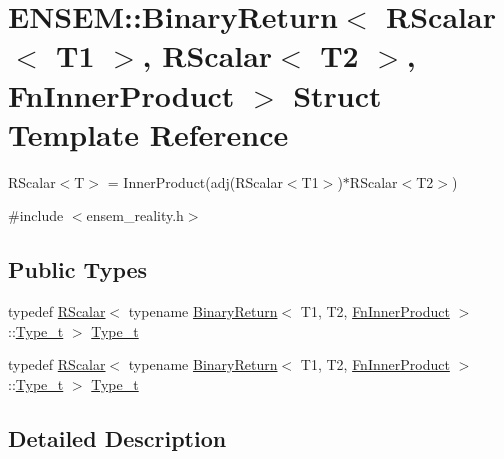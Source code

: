 \hypertarget{structENSEM_1_1BinaryReturn_3_01RScalar_3_01T1_01_4_00_01RScalar_3_01T2_01_4_00_01FnInnerProduct_01_4}{}\section{E\+N\+S\+EM\+:\+:Binary\+Return$<$ R\+Scalar$<$ T1 $>$, R\+Scalar$<$ T2 $>$, Fn\+Inner\+Product $>$ Struct Template Reference}
\label{structENSEM_1_1BinaryReturn_3_01RScalar_3_01T1_01_4_00_01RScalar_3_01T2_01_4_00_01FnInnerProduct_01_4}


R\+Scalar$<$\+T$>$ = Inner\+Product(adj(\+R\+Scalar$<$\+T1$>$)$\ast$\+R\+Scalar$<$\+T2$>$)  




{\ttfamily \#include $<$ensem\+\_\+reality.\+h$>$}

\subsection*{Public Types}
\begin{DoxyCompactItemize}
\item 
typedef \mbox{\hyperlink{classENSEM_1_1RScalar}{R\+Scalar}}$<$ typename \mbox{\hyperlink{structENSEM_1_1BinaryReturn}{Binary\+Return}}$<$ T1, T2, \mbox{\hyperlink{structENSEM_1_1FnInnerProduct}{Fn\+Inner\+Product}} $>$\+::\mbox{\hyperlink{structENSEM_1_1BinaryReturn_3_01RScalar_3_01T1_01_4_00_01RScalar_3_01T2_01_4_00_01FnInnerProduct_01_4_ab67f263abb333e0fd405c675a12d635e}{Type\+\_\+t}} $>$ \mbox{\hyperlink{structENSEM_1_1BinaryReturn_3_01RScalar_3_01T1_01_4_00_01RScalar_3_01T2_01_4_00_01FnInnerProduct_01_4_ab67f263abb333e0fd405c675a12d635e}{Type\+\_\+t}}
\item 
typedef \mbox{\hyperlink{classENSEM_1_1RScalar}{R\+Scalar}}$<$ typename \mbox{\hyperlink{structENSEM_1_1BinaryReturn}{Binary\+Return}}$<$ T1, T2, \mbox{\hyperlink{structENSEM_1_1FnInnerProduct}{Fn\+Inner\+Product}} $>$\+::\mbox{\hyperlink{structENSEM_1_1BinaryReturn_3_01RScalar_3_01T1_01_4_00_01RScalar_3_01T2_01_4_00_01FnInnerProduct_01_4_ab67f263abb333e0fd405c675a12d635e}{Type\+\_\+t}} $>$ \mbox{\hyperlink{structENSEM_1_1BinaryReturn_3_01RScalar_3_01T1_01_4_00_01RScalar_3_01T2_01_4_00_01FnInnerProduct_01_4_ab67f263abb333e0fd405c675a12d635e}{Type\+\_\+t}}
\end{DoxyCompactItemize}


\subsection{Detailed Description}
